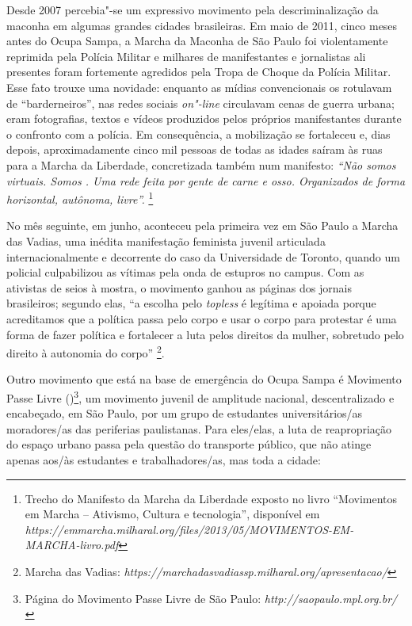 Desde 2007 percebia"-se um expressivo movimento pela descriminalização da
maconha em algumas grandes cidades brasileiras. Em maio de 2011, cinco
meses antes do Ocupa Sampa, a Marcha da Maconha de São Paulo foi
violentamente reprimida pela Polícia Militar e milhares de manifestantes
e jornalistas ali presentes foram fortemente agredidos pela Tropa de
Choque da Polícia Militar. Esse fato trouxe uma novidade: enquanto as
mídias convencionais os rotulavam de ``barderneiros'', nas redes sociais
\emph{on"-line} circulavam cenas de guerra urbana; eram fotografias,
textos e vídeos produzidos pelos próprios manifestantes durante o
confronto com a polícia. Em consequência, a mobilização se fortaleceu e,
dias depois, aproximadamente cinco mil pessoas de todas as idades saíram
às ruas para a Marcha da Liberdade, concretizada também num manifesto:
\emph{``Não somos virtuais. Somos . Uma rede feita por gente de
carne e osso. Organizados de forma horizontal, autônoma, livre''.}
\footnote{Trecho do Manifesto da Marcha da Liberdade exposto no livro
  ``Movimentos em Marcha -- Ativismo, Cultura e tecnologia'', disponível
  em
  \emph{https://emmarcha.milharal.org/files/2013/05/MOVIMENTOS-EM-MARCHA-livro.pdf}}

No mês seguinte, em junho, aconteceu pela primeira vez em São Paulo a
Marcha das Vadias, uma inédita manifestação feminista juvenil articulada
internacionalmente e decorrente do caso da Universidade de Toronto,
quando um policial culpabilizou as vítimas pela onda de estupros no
campus. Com as ativistas de seios à mostra, o movimento ganhou as
páginas dos jornais brasileiros; segundo elas, ``a escolha pelo
\emph{topless} é legítima e apoiada porque acreditamos que a política
passa pelo corpo e usar o corpo para protestar é uma forma de fazer
política e fortalecer a luta pelos direitos da mulher, sobretudo pelo
direito à autonomia do corpo'' \footnote{Marcha das Vadias:
  \emph{https://marchadasvadiassp.milharal.org/apresentacao/}}.

Outro movimento que está na base de emergência do Ocupa Sampa é
Movimento Passe Livre ()\footnote{Página do Movimento Passe Livre de
  São Paulo: \emph{http://saopaulo.mpl.org.br/}}, um movimento juvenil de
amplitude nacional, descentralizado e encabeçado, em São Paulo, por um
grupo de estudantes universitários/as moradores/as das periferias
paulistanas. Para eles/elas, a luta de reapropriação do espaço urbano
passa pela questão do transporte público, que não atinge apenas aos/às
estudantes e trabalhadores/as, mas toda a cidade:

